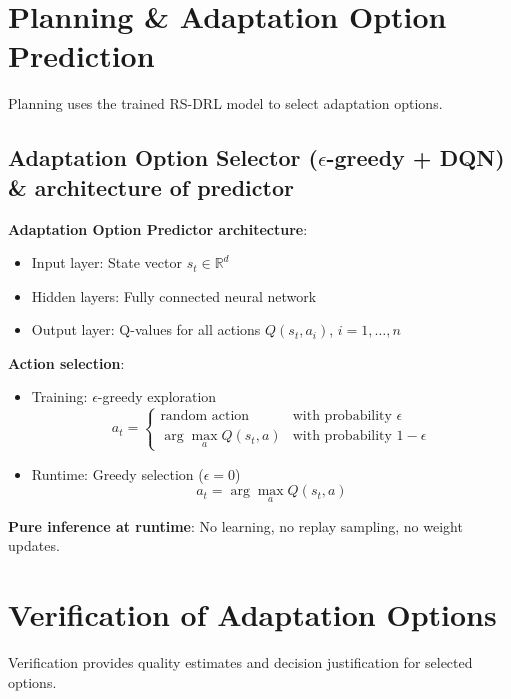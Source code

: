 \documentclass[11pt,a4paper]{article}
\begin{document}
\section{Planning \& Adaptation Option Prediction}

Planning uses the trained RS-DRL model to select adaptation options.

\subsection{Adaptation Option Selector ($\epsilon$-greedy + DQN) \& architecture of predictor}

\textbf{Adaptation Option Predictor architecture}:
\begin{itemize}
    \item Input layer: State vector $s_t \in \mathbb{R}^d$
    \item Hidden layers: Fully connected neural network
    \item Output layer: Q-values for all actions $Q(s_t, a_i)$, $i = 1, \ldots, n$
\end{itemize}

\textbf{Action selection}:
\begin{itemize}
    \item Training: $\epsilon$-greedy exploration
    \begin{equation}
    a_t = \begin{cases}
    \text{random action} & \text{with probability } \epsilon \\
    \arg\max_a Q(s_t, a) & \text{with probability } 1-\epsilon
    \end{cases}
    \end{equation}
    \item Runtime: Greedy selection ($\epsilon = 0$)
    \begin{equation}
    a_t = \arg\max_a Q(s_t, a)
    \end{equation}
\end{itemize}

\textbf{Pure inference at runtime}: No learning, no replay sampling, no weight updates.

\section{Verification of Adaptation Options}

Verification provides quality estimates and decision justification for selected options.
\end{document}
